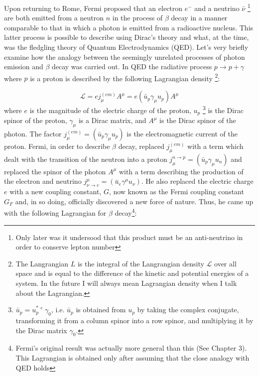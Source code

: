 \documentclass[a4paper,12pt]{book}
\begin{document}
Upon returning to Rome, Fermi proposed that an electron $e^{-}$ and a neutrino $\bar{\nu}$ \footnote{Only later was it undersood that this product must be an anti-neutrino in order to conserve lepton number} are both emitted from a neutron $n$ in the process of $\beta$ decay in a manner comparable to that in which a photon is emitted from a radioactive nucleus. This latter process is possible to describe using Dirac's  theory and what, at the time, was the fledgling theory of Quantum Electrodynamics (QED). Let's very briefly examine how the analogy between the seemingly unrelated processes of photon emission and $\beta$ decay was carried out. In QED the radiative process $p\longrightarrow p+\gamma$ where $p$ is a proton is described by the following Lagrangian density \footnote{The Langrangian $L$ is the integral of the Langrangian density $\mathcal{L}$ over all space and is equal to the difference of the kinetic and potential energies of a system. In the future I will always mean Lagrangian density when I talk about the Lagrangian.}:

\begin{equation}
 \mathcal{L}=ej_{\mu}^{(em)}A^{\mu}=e\left(\bar{u}_{p}\gamma_{\mu} u_{p}\right)A^{\mu}
\end{equation}
where $e$ is the magnitude of the electric charge of the proton, $u_{p}$ \footnote{$\bar{u}_{p}=u_{p}^{*+}\gamma_{0}$, i.e. $\bar{u}_{p}$ is obtained from $u_{p}$ by taking the complex conjugate, transforming it from a column spinor into a row spinor, and multiplying it by the Dirac matrix $\gamma_{0}$.} is the Dirac spinor of the proton, $\gamma_{\mu}$ is a Dirac matrix, and $A^{\mu}$ is the Dirac spinor of the photon. The factor $j_{\mu}^{(em)}=\left(\bar{u}_{p}\gamma_{\mu} u_{p}\right)$ is the electromagnetic current of the proton. Fermi, in order to describe $\beta$ decay, replaced $j_{\mu}^{(em)}$ with a term which dealt with the transition of the neutron into a proton $j_{\mu}^{n\rightarrow p}=\left(\bar{u}_{p}\gamma_{\mu} u_{n}\right)$ and replaced the spinor of the photon $A^{\mu}$ with a term describing the production of the electron and neutrino $j_{\nu \rightarrow e}^{\mu}=\left(\bar{u}_{e}\gamma^{\mu} u_{\nu}\right)$. He also replaced the electric charge $e$ with a new coupling constant, $G$, now known as the Fermi coupling constant $G_{F}$ \cite{morii} and, in so doing, officially discovered a new force of nature. Thus, he came up with the following Lagrangian for $\beta$ decay\footnote{Fermi's original result was actually more general than this (See Chapter 3). This Lagrangian is obtained only after assuming that the close analogy with QED holds}:
\end{document}
